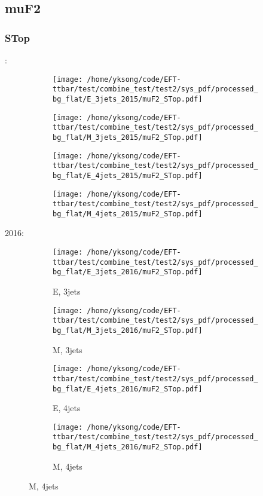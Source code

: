 \documentclass{beamer}
\begin{document}
\subsection{muF2}

\begin{frame}
\frametitle{STop}
\fontsize{5}{1}:
\begin{figure}
\centering
\begin{subfigure}[b]{0.24\textwidth}
\texttt{[image: /home/yksong/code/EFT-ttbar/test/combine\_test/test2/sys\_pdf/processed\_bg\_flat/E\_3jets\_2015/muF2\_STop.pdf]}
\end{subfigure}
\begin{subfigure}[b]{0.24\textwidth}
\texttt{[image: /home/yksong/code/EFT-ttbar/test/combine\_test/test2/sys\_pdf/processed\_bg\_flat/M\_3jets\_2015/muF2\_STop.pdf]}
\end{subfigure}
\begin{subfigure}[b]{0.24\textwidth}
\texttt{[image: /home/yksong/code/EFT-ttbar/test/combine\_test/test2/sys\_pdf/processed\_bg\_flat/E\_4jets\_2015/muF2\_STop.pdf]}
\end{subfigure}
\begin{subfigure}[b]{0.24\textwidth}
\texttt{[image: /home/yksong/code/EFT-ttbar/test/combine\_test/test2/sys\_pdf/processed\_bg\_flat/M\_4jets\_2015/muF2\_STop.pdf]}
\end{subfigure}
\end{figure}
2016:
\begin{figure}
\centering
\begin{subfigure}[b]{0.24\textwidth}
\texttt{[image: /home/yksong/code/EFT-ttbar/test/combine\_test/test2/sys\_pdf/processed\_bg\_flat/E\_3jets\_2016/muF2\_STop.pdf]}
\captionsetup{font=tiny}
\caption{E, 3jets}
\end{subfigure}
\begin{subfigure}[b]{0.24\textwidth}
\texttt{[image: /home/yksong/code/EFT-ttbar/test/combine\_test/test2/sys\_pdf/processed\_bg\_flat/M\_3jets\_2016/muF2\_STop.pdf]}
\captionsetup{font=tiny}
\caption{M, 3jets}
\end{subfigure}
\begin{subfigure}[b]{0.24\textwidth}
\texttt{[image: /home/yksong/code/EFT-ttbar/test/combine\_test/test2/sys\_pdf/processed\_bg\_flat/E\_4jets\_2016/muF2\_STop.pdf]}
\captionsetup{font=tiny}
\caption{E, 4jets}
\end{subfigure}
\begin{subfigure}[b]{0.24\textwidth}
\texttt{[image: /home/yksong/code/EFT-ttbar/test/combine\_test/test2/sys\_pdf/processed\_bg\_flat/M\_4jets\_2016/muF2\_STop.pdf]}
\captionsetup{font=tiny}
\caption{M, 4jets}
\end{subfigure}
\end{figure}
\end{frame}
\end{document}
